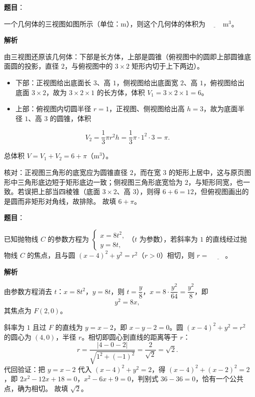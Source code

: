 \begin{answer}

\textbf{题目}：

一个几何体的三视图如图所示（单位：$\mathrm{m}$），则这个几何体的体积为 $\underline{\qquad}\ \mathrm{m}^3$。
\nopagebreak[4]
\begin{center}\end{center}
\nopagebreak[4]
\textbf{解析}

由三视图还原该几何体：下部是长方体，上部是圆锥（俯视图中的圆即上部圆锥底面圆的投影，直径 $2$，与俯视图中的 $3\times2$ 矩形内切于上下两边）。

\begin{itemize}
\item 下部：正视图给出底面长 $3$、高 $1$，侧视图给出底面宽 $2$、高 $1$，俯视图给出底面 $3\times2$，故为 $3\times2\times1$ 的长方体，体积 $V_1=3\times2\times1=6$。
\item 上部：俯视图内切圆半径 $r=1$，正视图、侧视图给出高 $h=3$，故为底面半径 $1$、高 $3$ 的圆锥，体积
\end{itemize}
\nopagebreak[4]
\[V_2=\frac13\pi r^2h=\frac13\pi\cdot1^2\cdot3=\pi.\]

总体积 $V=V_1+V_2=6+\pi$（$\mathrm{m}^3$）。

核对：正视图三角形的底宽应为圆锥直径 $2$，而在宽 $3$ 的矩形上居中，这与原页图形中三角形底边短于矩形底边一致；侧视图三角形底宽恰为 $2$，与矩形同宽，也一致。若误把上部当四棱锥（底面 $3\times2$、高 $3$），则得 $6+6=12$，但俯视图画出的是圆而非矩形对角线，故排除。
故填 $6+\pi$。


\end{answer}
\begin{answer}

\textbf{题目}：

已知抛物线 $C$ 的参数方程为 $\begin{cases}x=8t^2,\\ y=8t,\end{cases}$（$t$ 为参数），若斜率为 $1$ 的直线经过抛物线 $C$ 的焦点，且与圆 $(x-4)^2+y^2=r^2$（$r>0$）相切，则 $r=$ $\underline{\qquad}$。

\textbf{解析}

由参数方程消去 $t$：$x=8t^2$，$y=8t$，则 $t=\dfrac y8$，$x=8\cdot\dfrac{y^2}{64}=\dfrac{y^2}{8}$，即
\nopagebreak[4]
\[y^2=8x,\]
其焦点为 $F(2,0)$。

斜率为 $1$ 且过 $F$ 的直线为 $y=x-2$，即 $x-y-2=0$。圆 $(x-4)^2+y^2=r^2$ 的圆心为 $(4,0)$，半径 $r$。相切即圆心到直线的距离等于 $r$：
\nopagebreak[4]
\[r=\frac{|4-0-2|}{\sqrt{1^2+(-1)^2}}=\frac{2}{\sqrt2}=\sqrt2.\]
代回验证：把 $y=x-2$ 代入 $(x-4)^2+y^2=2$，得 $(x-4)^2+(x-2)^2=2$，即 $2x^2-12x+18=0$，$x^2-6x+9=0$，判别式 $36-36=0$，恰有一个公共点，确为相切。
故填 $\sqrt2$。


\end{answer}
